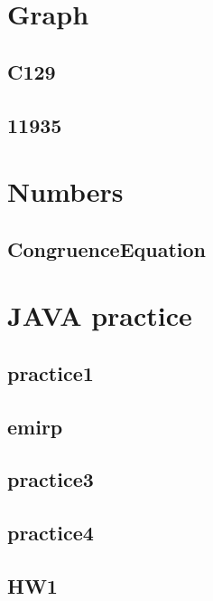 

\section{Graph}
    \subsection{C129}
        
    \subsection{11935}
        

\section{Numbers}
    \subsection{CongruenceEquation}
        

\section{JAVA practice}
    \subsection{practice1}
        
    \subsection{emirp}
        
    \subsection{practice3}
        
    \subsection{practice4}
        
    \subsection{HW1}
        
